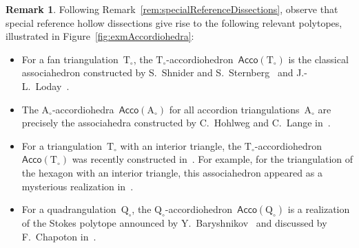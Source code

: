\documentclass{amsart}
\theoremstyle{definition}
\newtheorem{remark}[theorem]{Remark}
\newcommand{\Acco}{\mathsf{Acco}} %
\newcommand{\fref}[1]{Figure~\ref{#1}} %
\newcommand{\triangulation}{\mathrm{T}} %
\newcommand{\quadrangulation}{\mathrm{Q}} %
\newcommand{\accordion}{\mathrm{A}} %
\begin{document}
\begin{remark}
Following Remark~\ref{rem:specialReferenceDissections}, observe that special reference hollow dissections give rise to the following relevant polytopes, illustrated in \fref{fig:exmAccordiohedra}:
\begin{itemize}
\item For a fan triangulation~$\triangulation_\circ$, the $\triangulation_\circ$-accordiohedron~$\Acco(\triangulation_\circ)$ is the classical associahedron constructed by S.~Shnider and S.~Sternberg~\cite{ShniderSternberg} and J.-L.~Loday~\cite{Loday}.
\item The $\accordion_\circ$-accordiohedra~$\Acco(\accordion_\circ)$ for all accordion triangulations~$\accordion_\circ$ are precisely the associahedra constructed by C.~Hohlweg and C.~Lange in~\cite{HohlwegLange}.
\item For a triangulation~$\triangulation_\circ$ with an interior triangle, the $\triangulation_\circ$-accordiohedron~$\Acco(\triangulation_\circ)$ was recently constructed in~\cite{HohlwegPilaudStella}. For example, for the triangulation of the hexagon with an interior triangle, this associahedron appeared as a mysterious realization in~\cite{CeballosSantosZiegler}.
\item For a quadrangulation~$\quadrangulation_\circ$, the $\quadrangulation_\circ$-accordiohedron~$\Acco(\quadrangulation_\circ)$ is a realization of the Stokes polytope announced by Y.~Baryshnikov~\cite{Baryshnikov} and discussed by F.~Chapoton in~\cite{Chapoton-quadrangulations}.
\end{itemize}


\end{remark}
\end{document}
